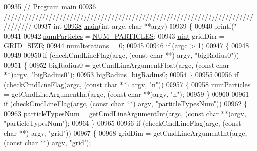 \begin{DoxyCode}
{{{{{{{00935 \textcolor{comment}{// Program main}
00936 \textcolor{comment}{////////////////////////////////////////////////////////////////////////////////}
00937 \textcolor{keywordtype}{int}
\hypertarget{particles_8cpp_source_l00938}{}\hyperlink{particles_8cpp_a3c04138a5bfe5d72780bb7e82a18e627}{00938} \hyperlink{particles_8cpp_a3c04138a5bfe5d72780bb7e82a18e627}{main}(\textcolor{keywordtype}{int} argc, \textcolor{keywordtype}{char} **argv)
00939 \{
00940     printf(\textcolor{stringliteral}{"%
00941 
00942     \hyperlink{particles_8cpp_a05b8a90212054a3eb1a036ae0c269596}{numParticles} = \hyperlink{particles_8cpp_a75cbc112dce4b21c13fe7bb671accab1}{NUM\_PARTICLES};
00943     \hyperlink{particles__kernel_8cuh_a91ad9478d81a7aaf2593e8d9c3d06a14}{uint} gridDim = \hyperlink{particles_8cpp_a08246606c233e7785a497c09672f366f}{GRID\_SIZE};
00944     \hyperlink{particles_8cpp_ad026ebba8c4123cf7b82751c88761f31}{numIterations} = 0;
00945 
00946     \textcolor{keywordflow}{if} (argc > 1)
00947     \{
00948 
00949 
00950                 \textcolor{keywordflow}{if} (checkCmdLineFlag(argc, (\textcolor{keyword}{const} \textcolor{keywordtype}{char} **) argv, \textcolor{stringliteral}{"bigRadius0"}))
00951         \{
00952             bigRadius0 = getCmdLineArgumentFloat(argc, (\textcolor{keyword}{const} \textcolor{keywordtype}{char} **)argv, \textcolor{stringliteral}{"bigRadius0"});
00953                         bigRadius=bigRadius0;
00954         \}
00955 
00956         \textcolor{keywordflow}{if} (checkCmdLineFlag(argc, (\textcolor{keyword}{const} \textcolor{keywordtype}{char} **) argv, \textcolor{stringliteral}{"n"}))
00957         \{
00958             numParticles = getCmdLineArgumentInt(argc, (\textcolor{keyword}{const} \textcolor{keywordtype}{char} **)argv, \textcolor{stringliteral}{"n"});
00959         \}
00960 
00961                 \textcolor{keywordflow}{if} (checkCmdLineFlag(argc, (\textcolor{keyword}{const} \textcolor{keywordtype}{char} **) argv, \textcolor{stringliteral}{"particleTypesNum"}))
00962         \{
00963             particleTypesNum = getCmdLineArgumentInt(argc, (\textcolor{keyword}{const} \textcolor{keywordtype}{char} **)argv, \textcolor{stringliteral}{"particleTypesNum"});
00964         \}
00965 
00966         \textcolor{keywordflow}{if} (checkCmdLineFlag(argc, (\textcolor{keyword}{const} \textcolor{keywordtype}{char} **) argv, \textcolor{stringliteral}{"grid"}))
00967         \{
00968             gridDim = getCmdLineArgumentInt(argc, (\textcolor{keyword}{const} \textcolor{keywordtype}{char} **) argv, \textcolor{stringliteral}{"grid"});
}}}}}}}}
\end{DoxyCode}
